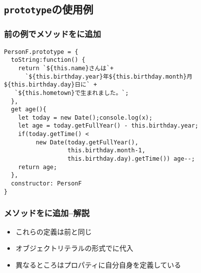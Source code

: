  \subsection{\protect\texttt{prototype}の使用例}
\begin{frame}[containsverbatim]
 \frametitle{前の例でメソッドをに追加}
{\scriptsize
\begin{Verbatim}
PersonF.prototype = {
  toString:function() {
    return `${this.name}さんは`+
      `${this.birthday.year}年${this.birthday.month}月${this.birthday.day}日に` +
   `${this.hometown}で生まれました。`;
  },
  get age(){
    let today = new Date();console.log(x);
    let age = today.getFullYear() - this.birthday.year;
    if(today.getTime() <
         new Date(today.getFullYear(),
                  this.birthday.month-1,
                  this.birthday.day).getTime()) age--;
    return age;
  },
  constructor: PersonF
}
\end{Verbatim}
}
\end{frame}
\begin{frame}[containsverbatim]
 \frametitle{メソッドをに追加--解説}
 \begin{itemize}
  \item これらの定義は前と同じ
  \item オブジェクトリテラルの形式でに代入
  \item 異なるところはプロパティに自分自身を定義している
 \end{itemize}
\end{frame}

